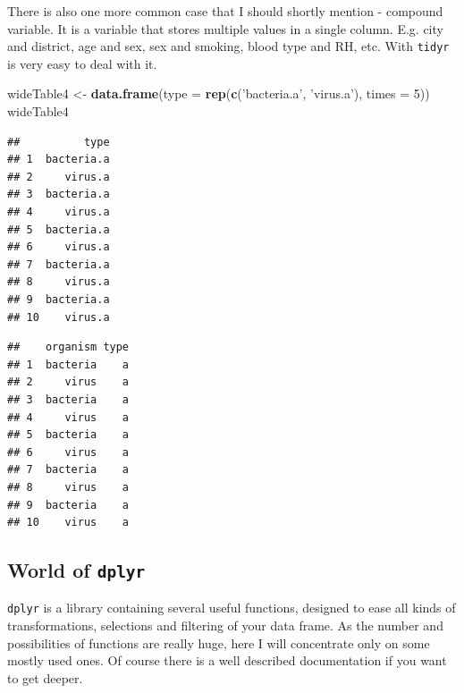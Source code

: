 \documentclass[]{book}
\newenvironment{Shaded}{\begin{snugshade}}{\end{snugshade}}
\newcommand{\KeywordTok}[1]{\textcolor[rgb]{0.13,0.29,0.53}{\textbf{#1}}}
\newcommand{\DataTypeTok}[1]{\textcolor[rgb]{0.13,0.29,0.53}{#1}}
\newcommand{\DecValTok}[1]{\textcolor[rgb]{0.00,0.00,0.81}{#1}}
\newcommand{\CharTok}[1]{\textcolor[rgb]{0.31,0.60,0.02}{#1}}
\newcommand{\StringTok}[1]{\textcolor[rgb]{0.31,0.60,0.02}{#1}}
\newcommand{\OperatorTok}[1]{\textcolor[rgb]{0.81,0.36,0.00}{\textbf{#1}}}
\newcommand{\NormalTok}[1]{#1}
\theoremstyle{definition}
\theoremstyle{definition}
\theoremstyle{definition}
\theoremstyle{remark}
\begin{document}
There is also one more common case that I should shortly mention -
compound variable. It is a variable that stores multiple values in a
single column. E.g. city and district, age and sex, sex and smoking,
blood type and RH, etc. With \texttt{tidyr} is very easy to deal with
it.

\begin{Shaded}
\begin{Highlighting}[]
\NormalTok{wideTable4 <-}\StringTok{ }\KeywordTok{data.frame}\NormalTok{(}\DataTypeTok{type =} \KeywordTok{rep}\NormalTok{(}\KeywordTok{c}\NormalTok{(}\StringTok{'bacteria.a'}\NormalTok{, }\StringTok{'virus.a'}\NormalTok{), }\DataTypeTok{times =} \DecValTok{5}\NormalTok{))}
\NormalTok{wideTable4}
\end{Highlighting}
\end{Shaded}

\begin{verbatim}
##          type
## 1  bacteria.a
## 2     virus.a
## 3  bacteria.a
## 4     virus.a
## 5  bacteria.a
## 6     virus.a
## 7  bacteria.a
## 8     virus.a
## 9  bacteria.a
## 10    virus.a
\end{verbatim}

\begin{Shaded}
\end{Shaded}

\begin{verbatim}
##    organism type
## 1  bacteria    a
## 2     virus    a
## 3  bacteria    a
## 4     virus    a
## 5  bacteria    a
## 6     virus    a
## 7  bacteria    a
## 8     virus    a
## 9  bacteria    a
## 10    virus    a
\end{verbatim}

\subsection{\texorpdfstring{World of
\texttt{dplyr}}{World of dplyr}}\label{world-of-dplyr}

\texttt{dplyr} is a library containing several useful functions,
designed to ease all kinds of transformations, selections and filtering
of your data frame. As the number and possibilities of functions are
really huge, here I will concentrate only on some mostly used ones. Of
course there is a well described documentation if you want to get
deeper.
\end{document}

